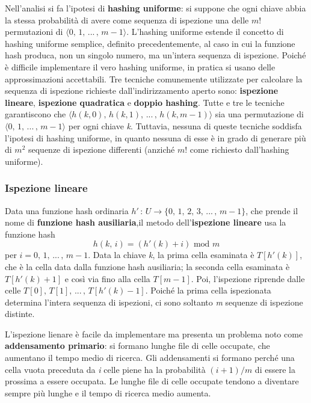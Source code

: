 \documentclass[10pt, a4paper]{report}
\begin{document}
Nell'analisi si fa l'ipotesi di \textbf{hashing uniforme}: si suppone che ogni chiave abbia la stessa probabilità di avere come sequenza di ispezione una delle $m!$ permutazioni di $\langle 0,\,1,\,...\,,\,m - 1  \rangle$. L'hashing uniforme estende il concetto di hashing uniforme semplice, definito precedentemente, al caso in cui la funzione hash produca, non un singolo numero, ma un'intera sequenza di ispezione. Poiché è difficile implementare il vero hashing uniforme, in pratica si usano delle approssimazioni accettabili. Tre tecniche comunemente utilizzate per calcolare la sequenza di ispezione richieste dall'indirizzamento aperto sono: \textbf{ispezione lineare}, \textbf{ispezione quadratica} e \textbf{doppio hashing}. Tutte e tre le tecniche garantiscono che $\langle h(k,0),\, h(k,1),\,...\,,\, h(k,m-1)\rangle$ sia una permutazione di $\langle 0,\,1,\,...\,,\,m - 1  \rangle$ per ogni chiave \textit{k}. Tuttavia, nessuna di queste tecniche soddisfa l'ipotesi di hashing uniforme, in quanto nessuna di esse è in grado di generare più di $m^2$ sequenze di ispezione differenti (anziché $m!$ come richiesto dall'hashing uniforme).
\subsubsection{Ispezione lineare}
Data una funzione hash ordinaria $h' \,:\, U \rightarrow \{0,\,1,\,2,\,3,\,...\,,\,m - 1\}$, che prende il nome di \textbf{funzione hash ausiliaria},il metodo dell'\textbf{ispezione lineare} usa la funzione hash
\begin{equation*}
h(k,\,i) = (h'(k) + i) \text{ mod } m
\end{equation*}
per $i = 0,\,1,\,...\,,\,m - 1$. Data la chiave \textit{k}, la prima cella esaminata è $T[h'(k)]$, che è la cella data dalla funzione hash ausiliaria; la seconda cella esaminata è $T[h'(k) + 1]$ e così via fino alla cella $T[m - 1]$. Poi, l'ispezione riprende dalle celle $T[0],\,T[1],\,...\,,\,T[h'(k) - 1]$. Poiché la prima cella ispezionata determina l'intera sequenza di ispezioni, ci sono soltanto \textit{m} sequenze di ispezione distinte.

L'ispezione lienare è facile da implementare ma presenta un problema noto come \textbf{addensamento primario}: si formano lunghe file di celle occupate, che aumentano il tempo medio di ricerca. Gli addensamenti si formano perché una cella vuota preceduta da \textit{i} celle piene ha la probabilità $(i + 1)/m$ di essere la prossima a essere occupata. Le lunghe file di celle occupate tendono a diventare sempre più lunghe e il tempo di ricerca medio aumenta.
\end{document}
